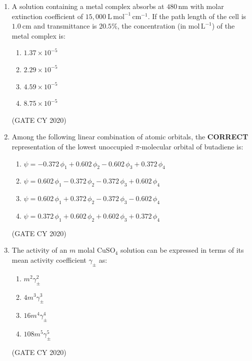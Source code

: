 \documentclass[12pt]{article}
\begin{document}
\begin{enumerate}
\item A solution containing a metal complex absorbs at $480\,\mathrm{nm}$ with molar extinction coefficient of $15{,}000\ \mathrm{L\,mol^{-1}\,cm^{-1}}$. If the path length of the cell is $1.0\ \mathrm{cm}$ and transmittance is $20.5\%$, the concentration (in $\mathrm{mol\,L^{-1}}$) of the metal complex is:
\begin{multicols}{2}
\begin{enumerate}
    \item $1.37\times10^{-5}$
    \item $2.29\times10^{-5}$
    \item $4.59\times10^{-5}$
    \item $8.75\times10^{-5}$
\end{enumerate}
\end{multicols}
\hfill (GATE CY 2020)

\item Among the following linear combination of atomic orbitals, the \textbf{CORRECT} representation of the lowest unoccupied $\pi$-molecular orbital of butadiene is:
\begin{multicols}{2}
\begin{enumerate}
    \item $\psi=-0.372\,\phi_1+0.602\,\phi_2-0.602\,\phi_3+0.372\,\phi_4$
    \item $\psi=0.602\,\phi_1-0.372\,\phi_2-0.372\,\phi_3+0.602\,\phi_4$
    \item $\psi=0.602\,\phi_1+0.372\,\phi_2-0.372\,\phi_3-0.602\,\phi_4$
    \item $\psi=0.372\,\phi_1+0.602\,\phi_2+0.602\,\phi_3+0.372\,\phi_4$
\end{enumerate}
\end{multicols}
\hfill (GATE CY 2020)

\item The activity of an $m$ molal CuSO$_4$ solution can be expressed in terms of its mean activity coefficient $\gamma_{\pm}$ as:
\begin{multicols}{2}
\begin{enumerate}
    \item $m^{2}\gamma_{\pm}^{2}$
    \item $4m^{3}\gamma_{\pm}^{3}$
    \item $16m^{4}\gamma_{\pm}^{4}$
    \item $108m^{5}\gamma_{\pm}^{5}$
\end{enumerate}
\end{multicols}
\hfill (GATE CY 2020)


\end{enumerate}
\end{document}
